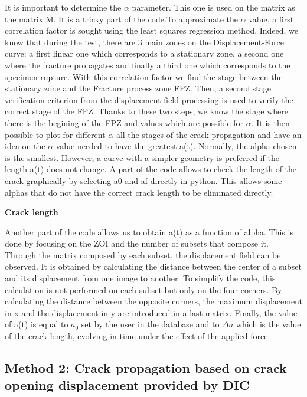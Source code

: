 It is important to determine the $\alpha$ parameter. This one is used on the matrix as the matrix M. It is a tricky part of the code.To approximate the $\alpha$ value, a first correlation factor is sought using the least squares regression method. Indeed, we know that during the test, there are 3 main zones on the Displacement-Force curve: a first linear one which corresponds to a stationary zone, a second one where the fracture propagates and finally a third one which corresponds to the specimen rupture. With this correlation factor we find the stage between the stationary zone and the Fracture process zone FPZ. Then, a second stage verification criterion from the displacement field processing is used to verify the correct stage of the FPZ.
Thanks to these two steps, we know the stage where there is the begining of the FPZ and values which are possible for $\alpha$.
It is then possible to plot for different $\alpha$ all the stages of the crack propagation and have an idea on the $\alpha$ value needed to have the greatest a(t). Normally, the alpha chosen is the smallest. However, a curve with a simpler geometry is preferred if the length a(t) does not change.
A part of the code allows to check the length of the crack graphically by selecting a0 and af directly in python. This allows some alphas that do not have the correct crack length to be eliminated directly.

\textbf{Crack length}

Another part of the code allows us to obtain a(t) as a function of alpha. This is done by focusing on the ZOI and the number of subsets that compose it. Through the matrix composed by each subset, the displacement field can be observed. It is obtained by calculating the distance between the center of a subset and its displacement from one image to another. To simplify the code, this calculation is not performed on each subset but only on the four corners. By calculating the distance between the opposite corners, the maximum displacement in x and the displacement in y are introduced in a last matrix. Finally, the value of a(t) is equal to $a_0$ set by the user in the database and to $\Delta a$ which is the value of the crack length, evolving in time under the effect of the applied force.

\subsection{Method 2: Crack propagation based on crack opening displacement provided by DIC}

